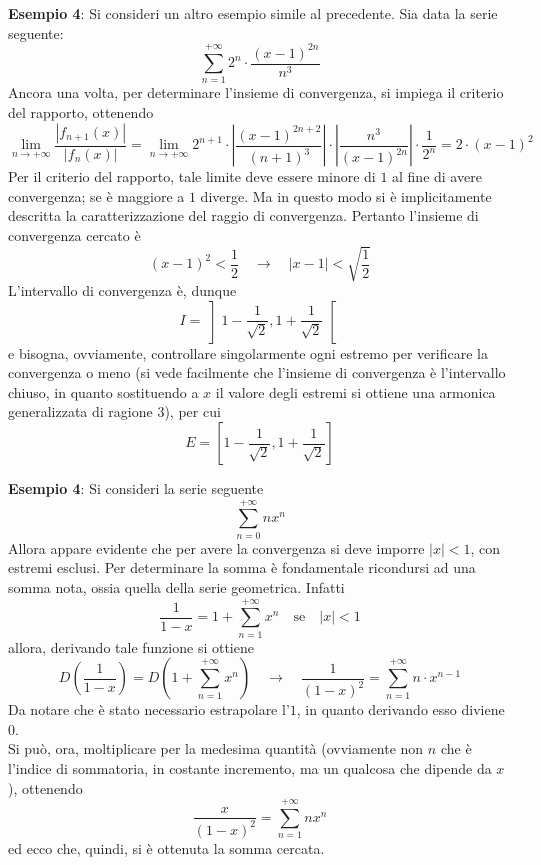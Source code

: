 \documentclass[a4paper]{extarticle}
\begin{document}
\vspace{2em}
\noindent
\textbf{Esempio 4}: Si consideri un altro esempio simile al precedente. Sia data la serie seguente:
\[\sum_{n=1}^{+\infty} 2^{n} \cdot \dfrac{(x-1)^{2n}}{n^3}\]
Ancora una volta, per determinare l'insieme di convergenza, si impiega il criterio del rapporto, ottenendo
\[\lim_{n \to +\infty} \dfrac{\left \vert f_{n+1}(x) \right \vert}{\left \vert f_n(x) \right \vert} = \lim_{n \to +\infty} 2^{n+1} \cdot \left \vert \dfrac{(x-1)^{2n+2}}{(n+1)^3} \right \vert \cdot \left \vert \dfrac{n^3}{(x-1)^{2n}} \right \vert \cdot \dfrac{1}{2^n} = 2 \cdot (x-1)^2\]
Per il criterio del rapporto, tale limite deve essere minore di $1$ al fine di avere convergenza; se è maggiore a $1$ diverge. Ma in questo modo si è implicitamente descritta la caratterizzazione del raggio di convergenza. Pertanto l'insieme di convergenza cercato è
\[(x-1)^2 < \dfrac{1}{2} \hspace{1em} \rightarrow \hspace{1em} \vert x-1 \vert < \sqrt{\dfrac{1}{2}}\]
L'intervallo di convergenza è, dunque
\[I=\left]1-\dfrac{1}{\sqrt{2}},1+\dfrac{1}{\sqrt{2}}\right[\]
e bisogna, ovviamente, controllare singolarmente ogni estremo per verificare la convergenza o meno (si vede facilmente che l'insieme di convergenza è l'intervallo chiuso, in quanto sostituendo a $x$ il valore degli estremi si ottiene una armonica generalizzata di ragione $3$), per cui
\[E=\left[1-\dfrac{1}{\sqrt{2}},1+\dfrac{1}{\sqrt{2}}\right]\]

\vspace{1em}
\noindent
\textbf{Esempio 4}: Si consideri la serie seguente
\[\sum_{n=0}^{+\infty} n x^n\]
Allora appare evidente che per avere la convergenza si deve imporre $\vert x \vert < 1$, con estremi esclusi. Per determinare la somma è fondamentale ricondursi ad una somma nota, ossia quella della serie geometrica. Infatti
\[\frac{1}{1-x} = 1 + \sum_{n=1}^{+\infty} x^n \hspace{1em} \text{se} \hspace{1em} \vert x \vert < 1\]
allora, derivando tale funzione si ottiene
\[D \left(\frac{1}{1-x}\right) = D \left(1 + \sum_{n=1}^{+\infty} x^n\right) \hspace{1em} \rightarrow \hspace{1em} \frac{1}{(1-x)^2}= \sum_{n=1}^{+\infty} n \cdot x^{n-1} \]
Da notare che è stato necessario estrapolare l'$1$, in quanto derivando esso diviene $0$.\\
Si può, ora, moltiplicare per la medesima quantità (ovviamente non $n$ che è l'indice di sommatoria, in costante incremento, ma un qualcosa che dipende da $x$), ottenendo
\[\frac{x}{(1-x)^2} = \sum_{n=1}^{+\infty} n x^n\]
ed ecco che, quindi, si è ottenuta la somma cercata.
\end{document}
